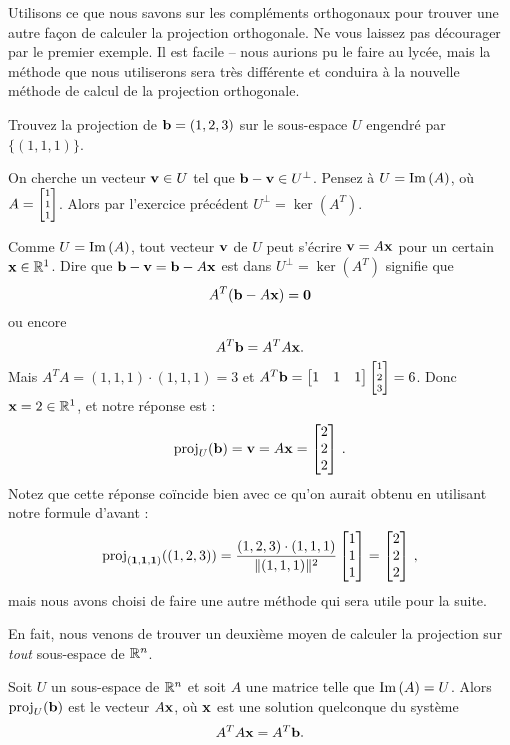 Utilisons ce que nous savons sur les compléments orthogonaux pour trouver une autre façon de calculer la projection orthogonale. Ne vous laissez pas décourager par le premier exemple. Il est facile -- nous aurions pu le faire au lycée, mais la méthode que nous utiliserons sera très différente et conduira à la nouvelle méthode de calcul de la projection orthogonale.

\bigskip
\begin{myprob}
Trouvez la projection de $\mathbf{b} = (1,2,3)$ sur le sous-espace $U$ 
engendr\'e par $\{ (1,1,1)\}$.

\begin{mysol}
On cherche un vecteur $\mathbf{v} \in U$ tel que $\mathbf{b}-\mathbf{v} \in U^\perp$.
Pensez à $U = \operatorname{Im}\,(A)$, où $A =\scriptsize \left[ \begin{matrix} 1\\1\\1 \end{matrix} \right]$.
Alors par l'exercice précédent $U^\perp = \ker(A^T)$.  

Comme $U = \operatorname{Im}\,(A)$, tout vecteur $\mathbf{v}$ de $U$ peut 
s'écrire $\mathbf{v}=A\mathbf{x}$ pour un certain $\mathbf{x}\in\mathbb{R}^1$.
Dire que $\mathbf{b}-\mathbf{v} = \mathbf{b}-A\mathbf{x}$ est dans $U^\perp = \ker(A^T)$
signifie que 
$$
A^T(\mathbf{b}-A\mathbf{x}) = \mathbf{0}
$$
ou encore
$$
 A^T\mathbf{b} = A^TA\mathbf{x}.
$$
Mais $A^TA = (1,1,1)\cdot (1,1,1) = 3$ et $A^T\mathbf{b} = \left[ \begin{matrix} 1 & 1 & 1 \end{matrix} \right]\scriptsize\left[ \begin{matrix} 1\\2\\3 \end{matrix} \right] = 6$. Donc $\mathbf{x} = 2\in\mathbb{R}^1$, et notre r\'eponse est :
$$
\operatorname{proj}_U(\mathbf{b}) = \mathbf{v} = A\mathbf{x} = \left[ \begin{matrix} 2\\2\\2 \end{matrix} \right]\,.
$$
Notez que cette réponse coïncide bien avec ce qu'on aurait obtenu en utilisant notre formule d'avant :
$$
\operatorname{proj}_{\mathbf{(1,1,1)}}((1,2,3)) = \frac{(1,2,3)\cdot (1,1,1)}{\|(1,1,1)\|^2} \left[ \begin{matrix} 1\\1\\1 \end{matrix} \right] = \left[ \begin{matrix} 2\\2\\2 \end{matrix} \right]\,,
$$
mais nous avons choisi de faire une autre méthode qui sera utile pour la suite.
\end{mysol}\end{myprob}

En fait, nous venons de trouver un deuxième moyen de calculer la projection sur
{\it tout} sous-espace de $\mathbb{R}^n$.

\begin{theorem}
Soit $U$ un sous-espace de $\mathbb{R}^n$ et soit $A$ une matrice telle que
$\operatorname{Im}\,(A) = U$.  Alors $\operatorname{proj}_U(\mathbf{b})$ est le vecteur $A\mathbf{x}$, 
où $\mathbf{x}$ est une solution quelconque du système
$$
A^TA \mathbf{x} = A^T \mathbf{b}.
$$
\end{theorem}

